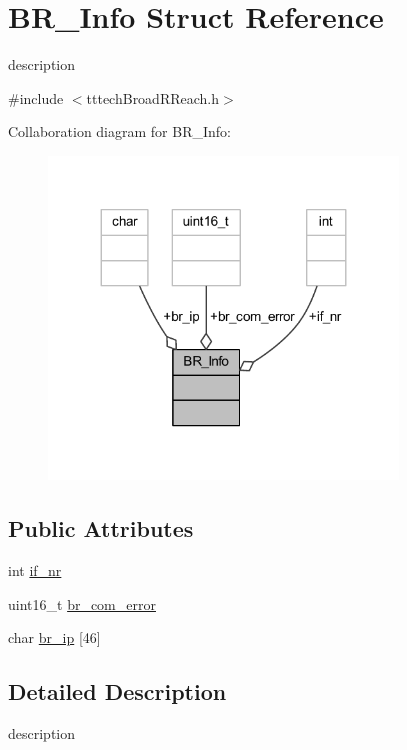 \hypertarget{struct_b_r___info}{}\section{B\+R\+\_\+\+Info Struct Reference}
\label{struct_b_r___info}


description  




{\ttfamily \#include $<$tttech\+Broad\+R\+Reach.\+h$>$}



Collaboration diagram for B\+R\+\_\+\+Info\+:\nopagebreak
\begin{figure}[H]
\begin{center}
\leavevmode
\includegraphics[width=263pt]{struct_b_r___info__coll__graph}
\end{center}
\end{figure}
\subsection*{Public Attributes}
\begin{DoxyCompactItemize}
\item 
int \mbox{\hyperlink{struct_b_r___info_ad3139482d149e41ec15ac355cf4d5251}{if\+\_\+nr}}
\item 
uint16\+\_\+t \mbox{\hyperlink{struct_b_r___info_ac3670b53bfa902bb4295495b61fb6985}{br\+\_\+com\+\_\+error}}
\item 
char \mbox{\hyperlink{struct_b_r___info_a8923532471f4ec953142656d0414765f}{br\+\_\+ip}} \mbox{[}46\mbox{]}
\end{DoxyCompactItemize}


\subsection{Detailed Description}
description 

